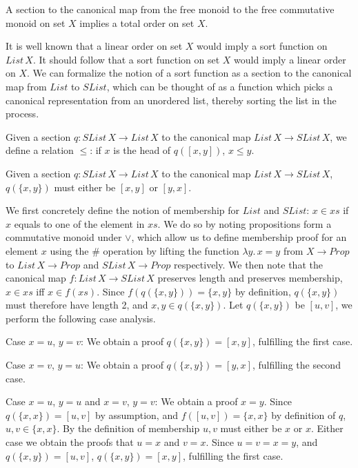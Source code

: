 \documentclass{article}
\begin{document}
\begin{myconj}
    A section to the canonical map from the free monoid to the free commutative monoid on set $X$ implies a total order on set $X$.
\end{myconj}
It is well known that a linear order on set $X$ would imply a sort function on $List \, X$. It should follow that a sort function on set $X$
would imply a linear order on $X$. We can formalize the notion of a sort function as a section to the canonical map from $List$ to
$SList$, which can be thought of as a function which picks a canonical representation from an unordered list, thereby sorting
the list in the process.

\begin{mydef}
    Given a section $q : SList \, X \rightarrow List \, X$ to the canonical map $List \, X \rightarrow SList \, X$,
    we define a relation $\leq$: if $x$ is the head of $q([x, y])$, $x \leq y$.
\end{mydef}

\begin{mylemma}
    \label{sort-either}
    Given a section $q : SList \, X \rightarrow List \, X$ to the canonical map $List \, X \rightarrow SList \, X$,
    $q(\{x, y\})$ must either be $[x, y]$ or $[y, x]$.
\end{mylemma}

We first concretely define the notion of membership for $List$ and $SList$: $x \in xs$ if $x$ equals to one of the element in $xs$.
We do so by noting propositions form a commutative monoid under $\vee$,
which allow us to define membership proof for an element $x$ using the $\#$ operation
by lifting the function $\lambda y. \, x = y$ from $X \rightarrow Prop$ to $List \, X \rightarrow Prop$ and $SList \, X \rightarrow Prop$ respectively.
We then note that the canonical map $f : List \, X \rightarrow SList \, X$ preserves length and preserves membership, $x \in xs$ iff $x \in f(xs)$.
Since $f(q(\{x, y\})) = \{x, y\}$ by definition, $q(\{x,y\})$ must therefore have length 2, and $x, y \in q(\{x, y\})$.
Let $q(\{x, y\})$ be $[u, v]$, we perform the following case analysis.

Case $x = u$, $y = v$: We obtain a proof $q(\{x, y\}) = [x, y]$, fulfilling the first case.

Case $x = v$, $y = u$: We obtain a proof $q(\{x, y\}) = [y, x]$, fulfilling the second case.

Case $x = u$, $y = u$ and $x = v$, $y = v$: We obtain a proof $x = y$. Since $q(\{x, x\}) = [u , v]$ by assumption,
and $f([u, v]) = \{x, x\}$ by definition of $q$, $u, v \in \{x, x\}$. By the definition of membership $u, v$ must either be $x$ or $x$.
Either case we obtain the proofs that $u = x$ and $v = x$. Since $u = v = x = y$, and $q(\{x, y\}) = [u, v]$, $q(\{x, y\}) = [x, y]$, fulfilling the first case.
\end{document}
